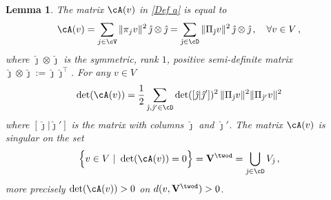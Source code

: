 \documentclass[11pt,a4paper,reqno]{article}
\numberwithin{equation}{section}
\newtheorem{lemma}[theorem]{Lemma}
\theoremstyle{definition}
\begin{document}
    
    \begin{lemma} \label{Properties of a}
   The matrix  $ \cA(v)$ in \eqref{Def a} is  equal to   
        \begin{equation} \label{NablaI(v)NablaI(v) in coordinates}
            \cA(v)= \sum_{j\in \cV}
            \|\pi_{j} v\|^2\, \hat\jmath\otimes \hat\jmath = \sum_{{\hat \jmath}\in \cD}
            \|\Pi_{\hat \jmath} v\|^2
            \, \hat\jmath\otimes \hat\jmath \, ,
            \quad  \forall 
            v \in V \, , 
        \end{equation}
    where $ \hat\jmath\otimes \hat\jmath $ is the symmetric, rank $ 1 $, positive semi-definite  matrix  $\hat \jmath \otimes \hat \jmath:=\hat \jmath \hat \jmath^\top$.
    For any $v\in V$
    \begin{equation}\label{detAespli}
     \det(\cA(v))=\frac12\sum_{\hat \jmath,\hat \jmath' \in \cD} \det([\hat \jmath| \hat \jmath'])^2\, \|\Pi_{\hat \jmath} v\|^2\|\Pi_{\hat \jmath'} v\|^2
    \end{equation}
    where $[\hat\jmath| \hat \jmath']$ is the matrix with columns  $\hat \jmath$ and $\hat \jmath'$.
      The matrix $ \cA(v) $ is singular    on the set 
        \begin{equation}\label{Def S*}
            \Big\{ v \in V \ |\ \det( \cA ( v))  =0 \Big\} = {\bf V}^{\twod}  = 
            \bigcup_{{\hat \jmath} \in \cD} V_{\hat \jmath} \, ,    
        \end{equation}
      more precisely 
    $ \det (\cA (v)) > 0 $  on  
$ d(v,{\bf V}^{\twod}) > 0 $. 
        \end{lemma}
\end{document}
